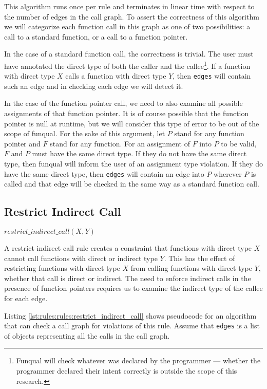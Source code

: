 This algorithm runs once per rule and terminates in linear time with respect to the number of edges in the call graph.  To assert the correctness of this algorithm we will categorize each function call in this graph as one of two possibilities:  a call to a standard function, or a call to a function pointer.

In the case of a standard function call, the correctness is trivial.  The user must have annotated the direct type of both the caller and the callee\footnote{Funqual will check whatever was declared by the programmer --- whether the programmer declared their intent correctly is outside the scope of this research.}.  If a function with direct type $X$ calls a function with direct type $Y$, then \lstinline{edges} will contain such an edge and in checking each edge we will detect it.  

In the case of the function pointer call, we need to also examine all possible assignments of that function pointer.  It is of course possible that the function pointer is null at runtime, but we will consider this type of error to be out of the scope of funqual.  For the sake of this argument, let $P$ stand for any function pointer and $F$ stand for any function.  For an assignment of $F$ into $P$ to be valid, $F$ and $P$ must have the same direct type.  If they do not have the same direct type, then funqual will inform the user of an assignment type violation.  If they do have the same direct type, then \lstinline{edges} will contain an edge into $P$ wherever $P$ is called and that edge will be checked in the same way as a standard function call.  

\subsection{Restrict Indirect Call}

\begin{center}
    $restrict\_indirect\_call(X, Y)$
\end{center}

A restrict indirect call rule creates a constraint that functions with direct type $X$ cannot call functions with direct or indirect type $Y$.  This has the effect of restricting functions with direct type $X$ from calling functions with direct type $Y$, whether that call is direct or indirect.  The need to enforce indirect calls in the presence of function pointers requires us to examine the indirect type of the callee for each edge.  

Listing \ref{lst:rules:rules:restrict_indirect_call} shows pseudocode for an algorithm that can check a call graph for violations of this rule.  Assume that \lstinline{edges} is a list of objects representing all the calls in the call graph.  

